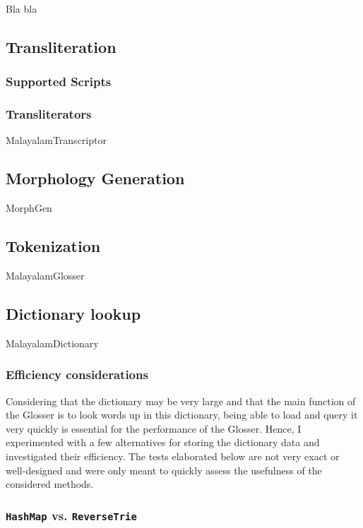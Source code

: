 \documentclass[a4paper]{article}
\newcommand{\typ}[1]{\texttt{#1}}
\begin{document}
Bla bla

\subsection{Transliteration}

\subsubsection{Supported Scripts}

\subsubsection{Transliterators}

MalayalamTranscriptor

\subsection{Morphology Generation}

MorphGen

\subsection{Tokenization}

MalayalamGlosser

\subsection{Dictionary lookup}

MalayalamDictionary

\subsubsection{Efficiency considerations}

Considering that the dictionary may be very large and that the main function of the Glosser is to look words up in this dictionary, being able to load and query it very quickly is essential for the performance of the Glosser. Hence, I experimented with a few alternatives for storing the dictionary data and investigated their efficiency. The tests elaborated below are not very exact or well-designed and were only meant to quickly assess the usefulness of the considered methods.

\subsubsection*{\typ{HashMap} vs. \typ{ReverseTrie}}
\end{document}
